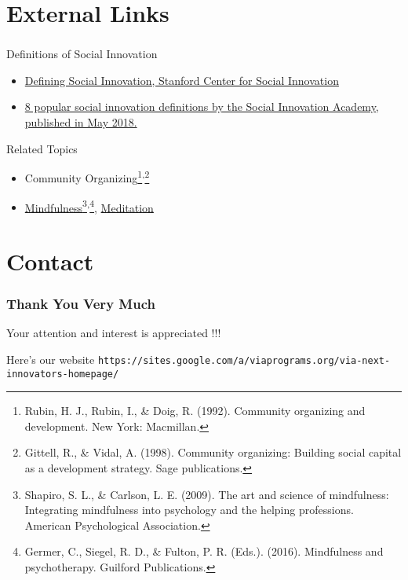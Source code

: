 \documentclass[dvipdfmx,10pt]{beamer}
\newcommand{\bb}{\begin{block}}
\newcommand{\eb}{\end{block}}
\newcommand{\ft}{\frametitle}
\begin{document}
\section{External Links}
\begin{frame}\ft{\insertsection}
\bb{Definitions of Social Innovation}
\begin{itemize}
    \item \href{https://www.gsb.stanford.edu/faculty-research/centers-initiatives/csi/defining-social-innovation}{Defining Social Innovation, Stanford Center for Social Innovation}
    \item \href{http://www.socialinnovationacademy.eu/8-popular-social-innovation-definitions/}{8 popular social innovation definitions by the Social Innovation Academy, published in May 2018.}
\end{itemize}
\eb
\begin{exampleblock}{Related Topics}
\begin{itemize}
    \item Community Organizing\footnote{Rubin, H. J., Rubin, I., \& Doig, R. (1992). Community organizing and development. New York: Macmillan.}\textsuperscript{,}\footnote{Gittell, R., \& Vidal, A. (1998). Community organizing: Building social capital as a development strategy. Sage publications.}
    \item \href{https://en.wikipedia.org/wiki/Mindfulness}{Mindfulness}\footnote{Shapiro, S. L., \& Carlson, L. E. (2009). The art and science of mindfulness: Integrating mindfulness into psychology and the helping professions. American Psychological Association.}\textsuperscript{,}\footnote{Germer, C., Siegel, R. D., \& Fulton, P. R. (Eds.). (2016). Mindfulness and psychotherapy. Guilford Publications.}, \href{https://en.wikipedia.org/wiki/Meditation}{Meditation}
\end{itemize}
\end{exampleblock}
\end{frame}
\section{Contact}
\begin{frame}\ft{Thank You Very Much}
Your attention and interest is appreciated !!!
\bb{Here's our website}
\footnotesize
\texttt{https://sites.google.com/a/viaprograms.org/via-next-innovators-homepage/}
\normalsize
\eb
\end{frame}
\end{document}
